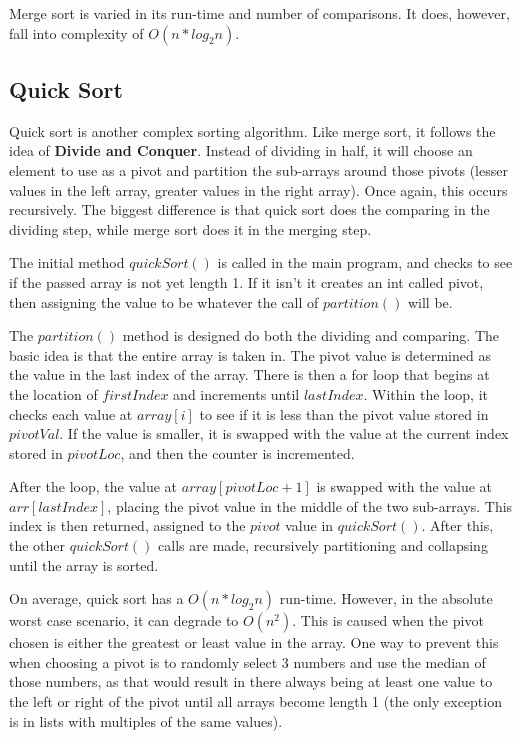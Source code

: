 \documentclass[letterpaper, 10pt,DIV=13]{scrartcl}
\numberwithin{equation}{section} %
\numberwithin{figure}{section} %
\numberwithin{table}{section} %
\begin{document}
Merge sort is varied in its run-time and number of comparisons. It does, however, fall into complexity of $O(n * log_2n)$.

\subsection{Quick Sort}
Quick sort is another complex sorting algorithm. Like merge sort, it follows the idea of \textbf{Divide and Conquer}. Instead of dividing in half, it will choose an element to use as a pivot and partition the sub-arrays around those pivots (lesser values in the left array, greater values in the right array). Once again, this occurs recursively. The biggest difference is that quick sort does the comparing in the dividing step, while merge sort does it in the merging step.

The initial method $quickSort()$ is called in the main program, and checks to see if the passed array is not yet length 1. If it isn't it creates an int called pivot, then assigning the value to be whatever the call of $partition()$ will be.

The $partition()$ method is designed do both the dividing and comparing. The basic idea is that the entire array is taken in. The pivot value is determined as the value in the last index of the array. There is then a for loop that begins at the location of $firstIndex$ and increments until $lastIndex$. Within the loop, it checks each value at $array[i]$ to see if it is less than the pivot value stored in $pivotVal$. If the value is smaller, it is swapped with the value at the current index stored in $pivotLoc$, and then the counter is incremented.

After the loop, the value at $array[pivotLoc+1]$ is swapped with the value at $arr[lastIndex]$, placing the pivot value in the middle of the two sub-arrays. This index is then returned, assigned to the $pivot$ value in $quickSort()$. After this, the other $quickSort()$ calls are made, recursively partitioning and collapsing until the array is sorted.

On average, quick sort has a $O(n * log_2n)$ run-time. However, in the absolute worst case scenario, it can degrade to $O(n^2)$. This is caused when the pivot chosen is either the greatest or least value in the array. One way to prevent this when choosing a pivot is to randomly select 3 numbers and use the median of those numbers, as that would result in there always being at least one value to the left or right of the pivot until all arrays become length 1 (the only exception is in lists with multiples of the same values).
\end{document}
